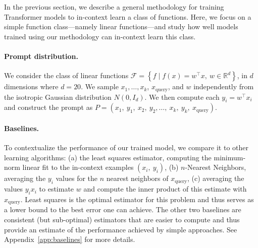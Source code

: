 In the previous section, we describe a general methodology for training Transformer models to in-context learn a class of functions.
Here, we focus on a simple function class---namely linear functions---and study how well models trained using our methodology can in-context learn this class.

\paragraph{Prompt distribution.}
We consider the class of linear functions $\mathcal{F} = \left\{f \mid  f(x) = w^\top x,\  w\in\mathbb{R}^d\right\}$, in $d$ dimensions where $d=20$.
We sample $x_1, \ldots, x_k$, $x_\text{query}$, and $w$ independently from the isotropic Gaussian distribution $N(0, I_d)$.
We then compute each $y_i=w^\top x_i$ and construct the prompt as $P = (x_1,\ y_1, \ x_2,\ y_2, \ldots,\ x_k,\ y_k,\ x_{\text{query}})$.



\paragraph{Baselines.} To contextualize the performance of our trained model, we compare it to other learning algorithms: 
(a) the least squares estimator, computing the minimum-norm linear fit to the in-context examples $(x_i,\ y_i)$,
(b) $n$-Nearest Neighbors, averaging the $y_i$ values for the $n$ nearest neighbors of $x_{\text{query}}$,
(c) averaging the values $y_ix_i$ to estimate $w$ and compute the inner product of this estimate with $x_\text{query}$.
Least squares is the optimal estimator for this problem and thus serves as a lower bound to the best error one can achieve.
The other two baselines are consistent (but sub-optimal) estimators that are easier to compute and thus provide an estimate of the performance achieved by simple approaches.
See Appendix~\ref{app:baselines} for more details.

